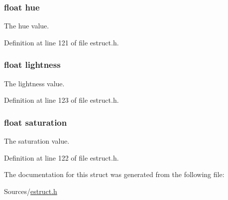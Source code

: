 \hypertarget{struct__hsla_a408d4a7316413ec687c945201a907e98}{
\subsubsection[{hue}]{\setlength{\rightskip}{0pt plus 5cm}float hue}}\label{struct__hsla_a408d4a7316413ec687c945201a907e98}
The hue value. 

Definition at line 121 of file estruct.\-h.

\hypertarget{struct__hsla_a9a22c1947d9e158ae5d791807fae36ed}{
\subsubsection[{lightness}]{\setlength{\rightskip}{0pt plus 5cm}float lightness}}\label{struct__hsla_a9a22c1947d9e158ae5d791807fae36ed}
The lightness value. 

Definition at line 123 of file estruct.\-h.

\hypertarget{struct__hsla_a953351912fb6da22fde59fe0f24909e7}{
\subsubsection[{saturation}]{\setlength{\rightskip}{0pt plus 5cm}float saturation}}\label{struct__hsla_a953351912fb6da22fde59fe0f24909e7}
The saturation value. 

Definition at line 122 of file estruct.\-h.



The documentation for this struct was generated from the following file\-:\begin{DoxyCompactItemize}
\item 
Sources/\hyperlink{estruct_8h}{estruct.\-h}\end{DoxyCompactItemize}
